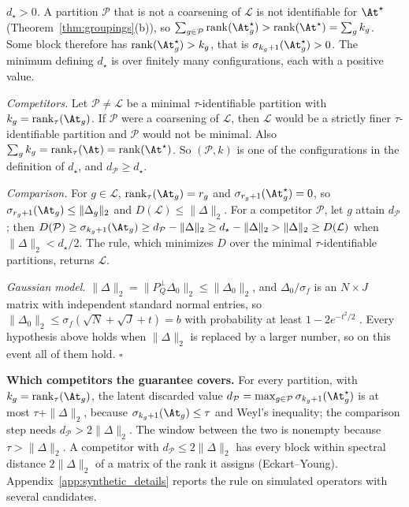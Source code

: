 \emph{\(d_\star>0\).}  A partition \(\mathcal P\) that is not a coarsening of
\(\mathcal L\) is not identifiable for \(\At^\star\) (Theorem~\ref{thm:groupings}(b)), so
\(\sum_{g\in\mathcal P}\operatorname{rank}(\At^\star_g)>\operatorname{rank}(\At^\star)=\sum_gk_g\).
Some block therefore has \(\operatorname{rank}(\At^\star_g)>k_g\), that is
\(\sigma_{k_g+1}(\At^\star_g)>0\).  The minimum defining \(d_\star\) is over finitely many
configurations, each with a positive value.

\emph{Competitors.}  Let \(\mathcal P\ne\mathcal L\) be a minimal \(\tau\)-identifiable
partition with \(k_g=\operatorname{rank}_\tau(\At_g)\).  If \(\mathcal P\) were a
coarsening of \(\mathcal L\), then \(\mathcal L\) would be a strictly finer
\(\tau\)-identifiable partition and \(\mathcal P\) would not be minimal.  Also
\(\sum_gk_g=\operatorname{rank}_\tau(\At)=\operatorname{rank}(\At^\star)\).  So
\((\mathcal P,k)\) is one of the configurations in the definition of \(d_\star\), and
\(d_{\mathcal P}\ge d_\star\).

\emph{Comparison.}  For \(g\in\mathcal L\), \(\operatorname{rank}_\tau(\At_g)=r_g\) and
\(\sigma_{r_g+1}(\At^\star_g)=0\), so \(\sigma_{r_g+1}(\At_g)\le\|\Delta_g\|_2\) and
\(D(\mathcal L)\le\|\Delta\|_2\).  For a competitor \(\mathcal P\), let \(g\) attain
\(d_{\mathcal P}\); then \(D(\mathcal P)\ge\sigma_{k_g+1}(\At_g)\ge d_{\mathcal P}-\|\Delta\|_2
\ge d_\star-\|\Delta\|_2>\|\Delta\|_2\ge D(\mathcal L)\) when \(\|\Delta\|_2<d_\star/2\).
The rule, which minimizes \(D\) over the minimal \(\tau\)-identifiable partitions,
returns \(\mathcal L\).

\emph{Gaussian model.}  \(\|\Delta\|_2=\|P_Q^\perp\Delta_0\|_2\le\|\Delta_0\|_2\), and
\(\Delta_0/\sigma_f\) is an \(N\times J\) matrix with independent standard normal entries,
so \(\|\Delta_0\|_2\le\sigma_f(\sqrt N+\sqrt J+t)=b\) with probability at least
\(1-2e^{-t^2/2}\) \citep[Corollary~5.35]{vershynin2012introduction}.  Every hypothesis
above holds when \(\|\Delta\|_2\) is replaced by a larger number, so on this event all
of them hold.  \(\square\)

\noindent\textbf{Which competitors the guarantee covers.}  For every partition, with
\(k_g=\operatorname{rank}_\tau(\At_g)\), the latent discarded value
\(d_{\mathcal P}=\max_{g\in\mathcal P}\sigma_{k_g+1}(\At^\star_g)\) is at most
\(\tau+\|\Delta\|_2\), because \(\sigma_{k_g+1}(\At_g)\le\tau\) and Weyl's inequality;
the comparison step needs \(d_{\mathcal P}>2\|\Delta\|_2\).  The window between the two
is nonempty because \(\tau>\|\Delta\|_2\).  A competitor with
\(d_{\mathcal P}\le2\|\Delta\|_2\) has every block within spectral distance
\(2\|\Delta\|_2\) of a matrix of the rank it assigns (Eckart--Young).  Appendix~\ref{app:synthetic_details}
reports the rule on simulated operators with several candidates.

